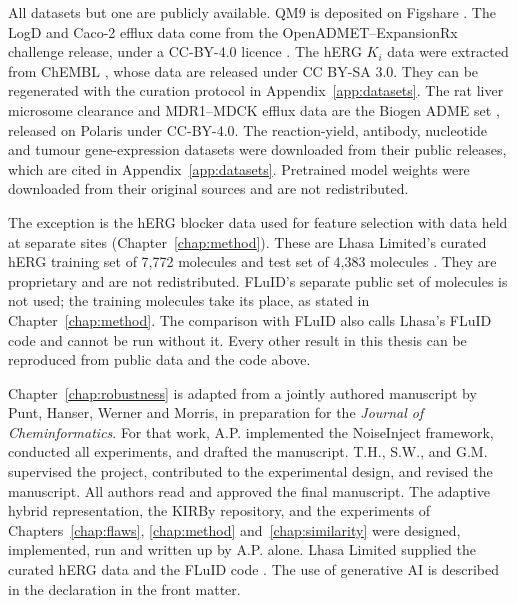 All datasets but one are publicly available. QM9 \citep{Ramakrishnan2014} is deposited on Figshare \citep{qm9_dataset}. The LogD and Caco-2 efflux data come from the OpenADMET--ExpansionRx challenge release, under a CC-BY-4.0 licence \citep{openadmet}. The hERG $K_i$ data were extracted from ChEMBL \citep{Zdrazil2023}, whose data are released under CC BY-SA 3.0. They can be regenerated with the curation protocol in Appendix~\ref{app:datasets}. The rat liver microsome clearance and MDR1--MDCK efflux data are the Biogen ADME set \citep{fang2023}, released on Polaris \citep{polaris} under CC-BY-4.0. The reaction-yield, antibody, nucleotide and tumour gene-expression datasets were downloaded from their public releases, which are cited in Appendix~\ref{app:datasets}. Pretrained model weights were downloaded from their original sources and are not redistributed.

The exception is the hERG blocker data used for feature selection with data held at separate sites (Chapter~\ref{chap:method}). These are Lhasa Limited's curated hERG training set of 7,772 molecules and test set of 4,383 molecules \citep{Hanser2025}. They are proprietary and are not redistributed. FLuID's separate public set of molecules is not used; the training molecules take its place, as stated in Chapter~\ref{chap:method}. The comparison with FLuID also calls Lhasa's FLuID code and cannot be run without it. Every other result in this thesis can be reproduced from public data and the code above.

Chapter~\ref{chap:robustness} is adapted from a jointly authored manuscript by Punt, Hanser, Werner and Morris, in preparation for the \textit{Journal of Cheminformatics}. For that work, A.P. implemented the NoiseInject framework, conducted all experiments, and drafted the manuscript. T.H., S.W., and G.M. supervised the project, contributed to the experimental design, and revised the manuscript. All authors read and approved the final manuscript. The adaptive hybrid representation, the KIRBy repository, and the experiments of Chapters~\ref{chap:flaws}, \ref{chap:method} and~\ref{chap:similarity} were designed, implemented, run and written up by A.P. alone. Lhasa Limited supplied the curated hERG data and the FLuID code \citep{Hanser2025}. The use of generative AI is described in the declaration in the front matter.
